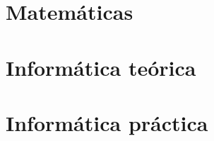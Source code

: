 \documentclass{book}
\begin{document}


\setcounter{tocdepth}{1}

\thispagestyle{plain}
\tableofcontents
\vspace*{\fill}
\doclicenseThis
\newpage
\thispagestyle{plain}


\part{Matemáticas}


\begin{comment}
\begin{prop}[Caracterizaciones de distancias asociadas a métricas] \label{prop:caract_distancias}
	
\end{prop}
\end{comment}












\part{Informática teórica}





 

\part{Informática práctica}






\printbibliography
\nocite{*}
\end{document}
